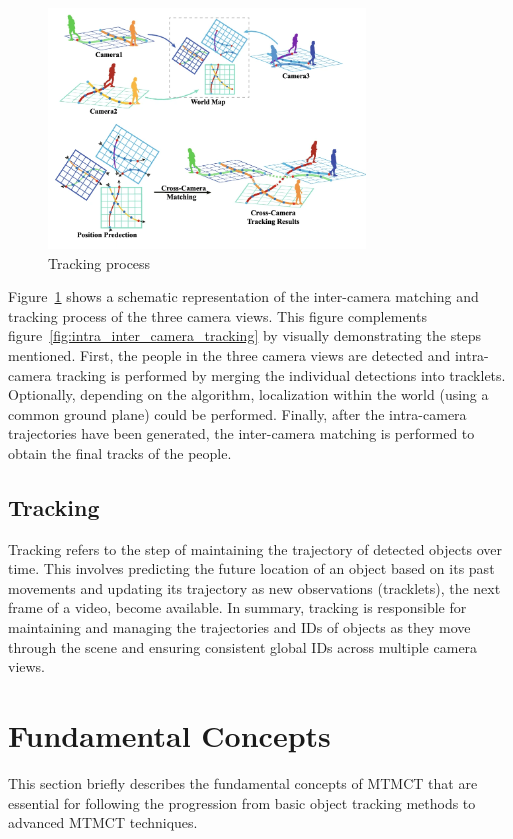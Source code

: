 \begin{figure}[ht]
    \centering
    \includegraphics[width=0.75\textwidth]{resources/fig/Ma21-tracking_process.png}
    \caption{Tracking process~\cite[Fig.~1]{Ma21}}\label{fig:projection}
\end{figure}

Figure~\ref{fig:projection} shows a schematic representation of the inter-camera matching and tracking process of the three camera views. This figure complements figure~\ref{fig:intra_inter_camera_tracking} by visually demonstrating the steps mentioned. First, the people in the three camera views are detected and intra-camera tracking is performed by merging the individual detections into tracklets. Optionally, depending on the algorithm, localization within the world (using a common ground plane) could be performed. Finally, after the intra-camera trajectories have been generated, the inter-camera matching is performed to obtain the final tracks of the people.

\subsection{Tracking}\label{subsec:tracking}
Tracking refers to the step of maintaining the trajectory of detected objects over time. This involves predicting the future location of an object based on its past movements and updating its trajectory as new observations (tracklets), the next frame of a video, become available. In summary, tracking is responsible for maintaining and managing the trajectories and IDs of objects as they move through the scene and ensuring consistent global IDs across multiple camera views.

\section{Fundamental Concepts}\label{sec:fundamental_concepts}
This section briefly describes the fundamental concepts of MTMCT that are essential for following the progression from basic object tracking methods to advanced MTMCT techniques.

